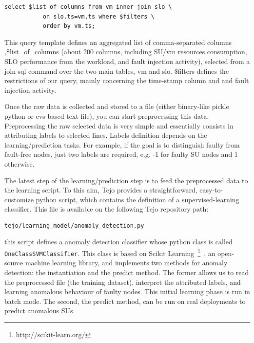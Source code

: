 \begin{lstlisting}
select $list_of_columns from vm inner join slo \
           on slo.ts=vm.ts where $filters \
           order by vm.ts;
\end{lstlisting}

This query template defines an aggregated list of comma-separated columns ,\$list\_of\_columns (about 200 columns, including SU/vm resources consumption, SLO performance from the workload, and fault injection activity), selected from a join sql command over the two main tables, vm and slo. \$filters defines the restrictions of our query, mainly concerning the time-stamp column and and fault injection activity.

Once the raw data is collected and stored to a file (either binary-like pickle python or cvs-based text file), you can start preprocessing this data. Preprocessing the raw selected data is very simple and essentially consists in attributing labels to selected lines. Labels definition depends on the learning/prediction tasks. For example, if the goal is to distinguish faulty from fault-free nodes, just two labels are required, e.g. -1 for faulty SU nodes and 1 otherwise.

The latest step of the learning/prediction step is to feed the preprocessed data to the learning script. To this aim, Tejo provides a straightforward, easy-to-customize python script, which contains the definition of a supervised-learning classifier. This file is available on the following Tejo repository path:

\begin{lstlisting}
tejo/learning_model/anomaly_detection.py
\end{lstlisting}

\noindent
this script defines a anomaly detection classifier whose python class is called \verb|OneClassSVMClassifier|. This class is based on Scikit Learning~\footnote{http://scikit-learn.org/}~\cite{scikitlearn11}, an open-source machine learning library, and implements two methods for anomaly detection: the instantiation and the predict method. The former allows us to read the preprocessed file (the training dataset), interpret the attributed labels, and learning anomalous behaviour of faulty nodes. This initial learning phase is run in batch mode. The second, the predict method, can be run on real deployments to predict anomalous SUs. 